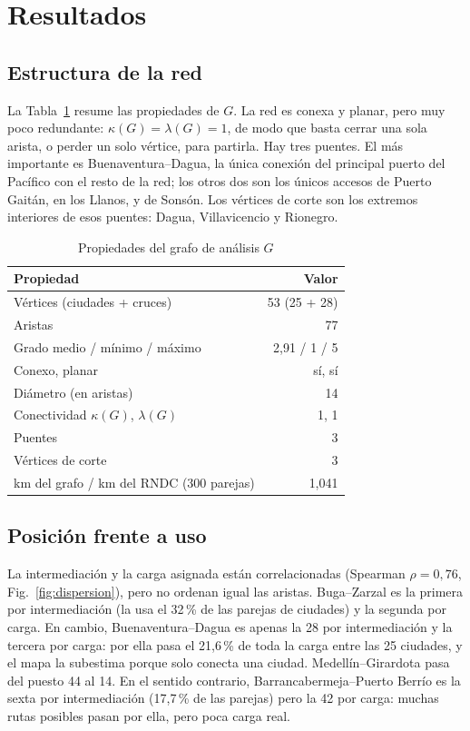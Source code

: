 \documentclass[conference]{IEEEtran}
\begin{document}
\section{Resultados}
\label{sec:resultados}

\subsection{Estructura de la red}
La Tabla~\ref{tab:estructura} resume las propiedades de $G$. La red es conexa y
planar, pero muy poco redundante: $\kappa(G)=\lambda(G)=1$, de modo que basta
cerrar una sola arista, o perder un solo vértice, para partirla. Hay tres
puentes. El más importante es Buenaventura--Dagua, la única conexión del
principal puerto del Pacífico con el resto de la red; los otros dos son los
únicos accesos de Puerto Gaitán, en los Llanos, y de Sonsón. Los vértices de corte son los
extremos interiores de esos puentes: Dagua, Villavicencio y Rionegro.

\begin{table}[t]
\caption{Propiedades del grafo de análisis $G$}
\label{tab:estructura}
\centering
\footnotesize
\begin{tabular}{@{}lr@{}}
\toprule
Propiedad & Valor \\
\midrule
Vértices (ciudades + cruces) & 53 (25 + 28) \\
Aristas & 77 \\
Grado medio / mínimo / máximo & 2,91 / 1 / 5 \\
Conexo, planar & sí, sí \\
Diámetro (en aristas) & 14 \\
Conectividad $\kappa(G)$, $\lambda(G)$ & 1, 1 \\
Puentes & 3 \\
Vértices de corte & 3 \\
km del grafo / km del RNDC (300 parejas) & 1,041 \\
\bottomrule
\end{tabular}
\end{table}

\subsection{Posición frente a uso}
La intermediación y la carga asignada están correlacionadas (Spearman
$\rho=0{,}76$, Fig.~\ref{fig:dispersion}), pero no ordenan igual las aristas.
Buga--Zarzal es la primera por intermediación (la usa el 32\,\% de las parejas
de ciudades) y la segunda por carga. En cambio, Buenaventura--Dagua es apenas la
28 por intermediación y la tercera por carga: por ella pasa el 21,6\,\% de toda
la carga entre las 25 ciudades, y el mapa la subestima porque solo conecta una
ciudad. Medellín--Girardota pasa del puesto 44 al 14. En el sentido contrario,
Barrancabermeja--Puerto Berrío es la sexta por intermediación (17,7\,\% de las
parejas) pero la 42 por carga: muchas rutas posibles pasan por ella, pero poca
carga real.
\end{document}
